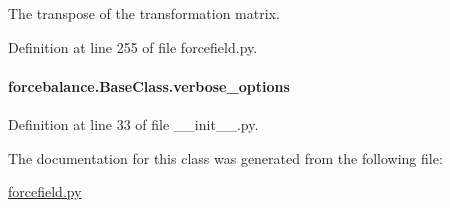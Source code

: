 The transpose of the transformation matrix. 



Definition at line 255 of file forcefield.\-py.

\hypertarget{classforcebalance_1_1BaseClass_afd68efa29ccd2f320f4cf82198214aac}{
\paragraph[{verbose\-\_\-options}]{\setlength{\rightskip}{0pt plus 5cm}forcebalance.\-Base\-Class.\-verbose\-\_\-options\hspace{0.3cm}{\ttfamily [inherited]}}}\label{classforcebalance_1_1BaseClass_afd68efa29ccd2f320f4cf82198214aac}


Definition at line 33 of file \-\_\-\-\_\-init\-\_\-\-\_\-.\-py.



The documentation for this class was generated from the following file\-:\begin{DoxyCompactItemize}
\item 
\hyperlink{forcefield_8py}{forcefield.\-py}\end{DoxyCompactItemize}
